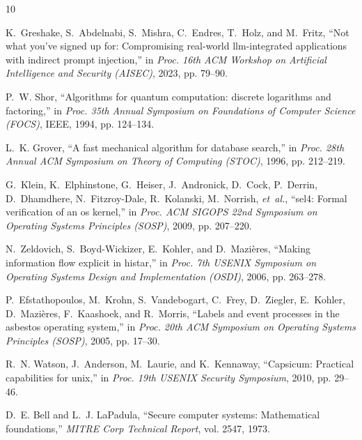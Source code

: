 \documentclass[10pt,journal,compsoc]{IEEEtran}
\theoremstyle{definition}
\begin{document}

\begin{thebibliography}{10}

K.~Greshake, S.~Abdelnabi, S.~Mishra, C.~Endres, T.~Holz, and M.~Fritz,
  ``Not what you've signed up for: Compromising real-world llm-integrated applications with indirect prompt injection,''
  in \emph{Proc. 16th ACM Workshop on Artificial Intelligence and Security (AISEC)}, 2023, pp. 79--90.

P.~W. Shor,
  ``Algorithms for quantum computation: discrete logarithms and factoring,''
  in \emph{Proc. 35th Annual Symposium on Foundations of Computer Science (FOCS)}, IEEE, 1994, pp. 124--134.

L.~K. Grover,
  ``A fast mechanical algorithm for database search,''
  in \emph{Proc. 28th Annual ACM Symposium on Theory of Computing (STOC)}, 1996, pp. 212--219.

G.~Klein, K.~Elphinstone, G.~Heiser, J.~Andronick, D.~Cock, P.~Derrin, D.~Dhamdhere, N.~Fitzroy-Dale, R.~Kolanski, M.~Norrish, \emph{et~al.},
  ``sel4: Formal verification of an os kernel,''
  in \emph{Proc. ACM SIGOPS 22nd Symposium on Operating Systems Principles (SOSP)}, 2009, pp. 207--220.

N.~Zeldovich, S.~Boyd-Wickizer, E.~Kohler, and D.~Mazi{\`e}res,
  ``Making information flow explicit in histar,''
  in \emph{Proc. 7th USENIX Symposium on Operating Systems Design and Implementation (OSDI)}, 2006, pp. 263--278.

P.~Efstathopoulos, M.~Krohn, S.~Vandebogart, C.~Frey, D.~Ziegler, E.~Kohler, D.~Mazi{\`e}res, F.~Kaashoek, and R.~Morris,
  ``Labels and event processes in the asbestos operating system,''
  in \emph{Proc. 20th ACM Symposium on Operating Systems Principles (SOSP)}, 2005, pp. 17--30.

R.~N. Watson, J.~Anderson, M.~Laurie, and K.~Kennaway,
  ``Capsicum: Practical capabilities for unix,''
  in \emph{Proc. 19th USENIX Security Symposium}, 2010, pp. 29--46.

D.~E. Bell and L.~J. LaPadula,
  ``Secure computer systems: Mathematical foundations,''
  \emph{MITRE Corp Technical Report}, vol. 2547, 1973.


\end{thebibliography}
\end{document}
